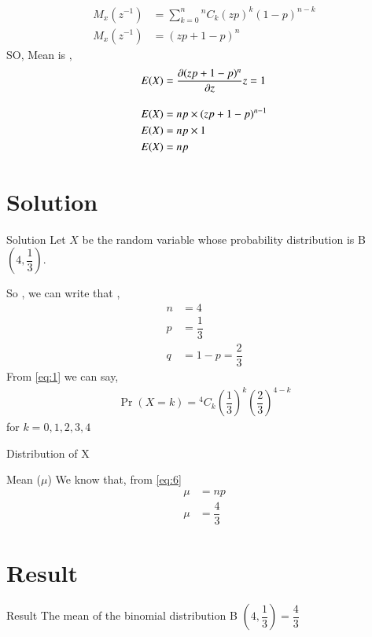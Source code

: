 \documentclass{beamer}
\providecommand{\pr}[1]{\ensuremath{\Pr\left(#1\right)}}
\newcommand*{\Comb}[2]{{}^{#1}C_{#2}}
\providecommand{\brak}[1]{\ensuremath{\left(#1\right)}}
\begin{document}
        \begin{frame}
        \begin{align}
        M_x(z^{-1}) &= \sum^{n}_{k=0} \Comb{n}{k} (zp)^k\brak{1-p}^{n-k} \\[10pt]
            M_x(z^{-1}) &=  (zp + 1 - p)^n 
            \end{align}
            SO, Mean is ,
            \begin{align}
            E(X) &= \diffp {(zp + 1 - p)^n}z{z=1} \\[10pt]
            E(X) &= np  \times (zp + 1 - p)^{n-1} \\
            E(X) &= np \times 1 \\
            E(X) &= np
            \label{eq:6}
        \end{align}
            
        \end{frame}
    
    \section{Solution}
    \begin{frame}{Solution}
    Let $X$ be the random variable whose probability distribution is B \brak{4,\dfrac{1}{3}}.
    
    So , we can write that ,
    \begin{align}
        n &=4 \\
        p &= \dfrac{1}{3} \\
        q &= 1- p = \dfrac{2}{3}
    \end{align}
    From \eqref{eq:1} we can say,
    \begin{align}
        \pr{X = k} = \Comb{4}{k} \brak{\dfrac{1}{3}}^k\brak{\dfrac{2}{3}}^{4-k}
    \end{align}
    for $k = 0,1,2,3,4$
    \end{frame}
    
    \begin{frame}{Distribution of X}
    \begin{table}[ht!]
    \def\arraystretch{1.53}
        
        \caption{Probability Distribution of X}
        \label{Table1}
    \end{table}
    \end{frame}
    
    \begin{frame}{Mean ($\mu$)}
    We know that, from \eqref{eq:6}
        \begin{align}
            \mu &= np \\
            \mu &= \dfrac{4}{3}
        \end{align}
    \end{frame}
    
    \section{Result}
    \begin{frame}{Result}
        The mean of the binomial distribution B $\brak{4,\dfrac{1}{3}} = \dfrac{4}{3}$
    \end{frame}
\end{document}
